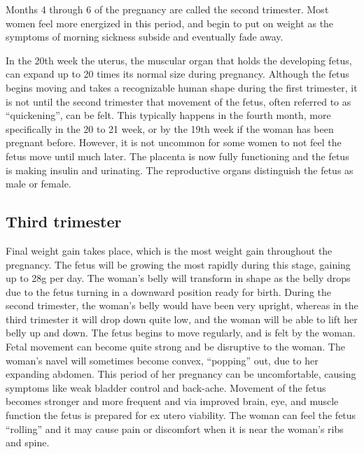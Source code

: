 \documentclass[12pt,a4paper,onecolumn]{article}
\begin{document}
\begin{figwindow}
Months 4 through 6 of the pregnancy are called the second trimester. Most women feel more energized
in this period, and begin to put on weight as the symptoms of morning sickness subside and
eventually fade away.

In the 20th week the uterus, the muscular organ that holds the developing fetus, can expand up to 20
times its normal size during pregnancy. Although the fetus begins moving and takes a recognizable
human shape during the first trimester, it is not until the second trimester that movement of the
fetus, often referred to as ``quickening'', can be felt. This typically happens in the fourth month,
more specifically in the 20 to 21 week, or by the 19th week if the woman has been pregnant before.
However, it is not uncommon for some women to not feel the fetus move until much later. The placenta
is now fully functioning and the fetus is making insulin and urinating. The reproductive organs
distinguish the fetus as male or female.
\end{figwindow}

\subsection{Third trimester}

Final weight gain takes place, which is the most weight gain throughout the pregnancy. The fetus
will be growing the most rapidly during this stage, gaining up to 28g per day. The woman's belly
will transform in shape as the belly drops due to the fetus turning in a downward position ready for
birth. During the second trimester, the woman's belly would have been very upright, whereas in the
third trimester it will drop down quite low, and the woman will be able to lift her belly up and
down. The fetus begins to move regularly, and is felt by the woman. Fetal movement can become quite
strong and be disruptive to the woman. The woman's navel will sometimes become convex, ``popping''
out, due to her expanding abdomen. This period of her pregnancy can be uncomfortable, causing
symptoms like weak bladder control and back-ache. Movement of the fetus becomes stronger and more
frequent and via improved brain, eye, and muscle function the fetus is prepared for ex utero
viability. The woman can feel the fetus ``rolling'' and it may cause pain or discomfort when it is
near the woman's ribs and spine.
\end{document}
